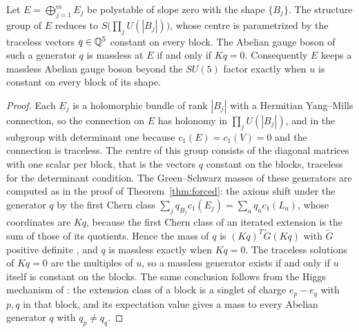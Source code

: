 \begin{lemma}\label{lem:branchfactor}
Let $E=\bigoplus_{j=1}^mE_j$ be polystable of slope zero with the shape
$\{B_j\}$. The structure group of $E$ reduces to
$S\bigl(\prod_jU(|B_j|)\bigr)$, whose centre is parametrized by the
traceless vectors $q\in\mathbb{Q}^5$ constant on every block. The Abelian gauge
boson of such a generator $q$ is massless at $E$ if and only if $Kq=0$.
Consequently $E$ keeps a massless Abelian gauge boson beyond the
$SU(5)$ factor exactly when $u$ is constant on every block of its shape.
\end{lemma}
\begin{proof}
Each $E_j$ is a holomorphic bundle of rank $|B_j|$ with a Hermitian
Yang--Mills connection, so the connection on $E$ has holonomy in
$\prod_jU(|B_j|)$, and in the subgroup with determinant one because
$c_1(E)=c_1(V)=0$ and the connection is traceless. The centre of this group
consists of the diagonal matrices with one scalar per block, that is the
vectors $q$ constant on the blocks, traceless for the determinant
condition. The Green--Schwarz masses of these generators are computed as in
the proof of Theorem~\ref{thm:forced}: the axions shift under the generator
$q$ by the first Chern class $\sum_jq_{B_j}c_1(E_j)=\sum_aq_ac_1(L_a)$,
whose coordinates are $Kq$, because the first Chern class of an iterated
extension is the sum of those of its quotients. Hence the mass of $q$ is
$(Kq)^T\widetilde G(Kq)$ with $\widetilde G$ positive definite
\cite[Section~2.7]{AGLP12}, and $q$ is massless exactly when $Kq=0$. The
traceless solutions of $Kq=0$ are the multiples of $u$, so a massless
generator exists if and only if $u$ itself is constant on the blocks.
The same conclusion follows from the Higgs mechanism of
\cite{AGL09}: the extension class of a block is a singlet of charge
$e_p-e_q$ with $p,q$ in that block, and its expectation value gives a
mass to every Abelian generator $q$ with $q_p\ne q_q$.
\end{proof}

